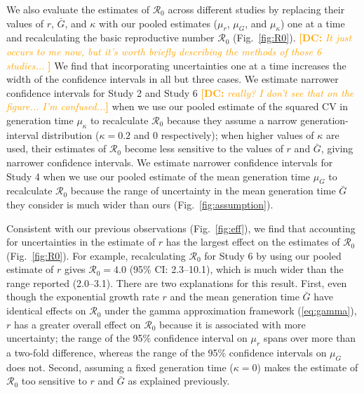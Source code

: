 \documentclass[12pt]{article}
\newcommand{\eref}[1]{(\ref{eq:#1})}
\newcommand{\fref}[1]{Fig.~\ref{fig:#1}}
\newcommand{\comment}[3]{\textcolor{#1}{\textbf{[#2: }\textsl{#3}\textbf{]}}}
\newcommand{\dc}[1]{\comment{Orange}{DC}{#1}}
\begin{document}
We also evaluate the estimates of $\mathcal R_0$ across different studies by 
replacing their values of $r$, $\bar G$, and $\kappa$ with our pooled estimates ($\mu_r$, $\mu_G$, and $\mu_\kappa$) one at a time and recalculating the basic reproductive number $\mathcal R_0$ (\fref{R0}).
\dc{It just occurs to me now, but it's worth briefly describing the methods of those 6 studies... }
We find that incorporating uncertainties one at a time increases the width of the confidence intervals in all but three cases.
We estimate narrower confidence intervals for Study 2 and Study 6 \dc{really? I don't see that on the figure... I'm confused...}
 when we use our pooled estimate of the squared CV in generation time $\mu_\kappa$ to recalculate $\mathcal R_0$ because they assume a narrow generation-interval distribution ($\kappa=0.2$ and $0$ respectively);
when higher values of $\kappa$ are used, their estimates of $\mathcal R_0$ become less sensitive to the values of $r$ and $\bar G$, giving narrower confidence intervals.
We estimate narrower confidence intervals for Study 4 when we use our pooled estimate of the mean generation time $\mu_G$ to recalculate $\mathcal R_0$ because the range of uncertainty in the mean generation time $\bar G$ they consider is much wider than ours (\fref{assumption}).

Consistent with our previous observations (\fref{eff}),
we find that accounting for uncertainties in the estimate of $r$ has the largest effect on the estimates of $\mathcal R_0$ (\fref{R0}).
For example, recalculating $\mathcal R_0$ for Study 6 by using our pooled estimate of $r$ gives $\mathcal R_0 = 4.0$ (95\% CI: 2.3--10.1), which is much wider than the range reported (2.0--3.1).
There are two explanations for this result.
First, even though the exponential growth rate $r$ and the mean generation time $\bar G$ have identical effects on $\mathcal R_0$ under the gamma approximation framework \eref{gamma},
$r$ has a greater overall effect on $\mathcal R_0$ because it is associated with more uncertainty;
the range of the 95\% confidence interval on $\mu_r$ spans over more than a two-fold difference, whereas the range of the 95\% confidence intervals on $\mu_G$ does not.
Second, assuming a fixed generation time ($\kappa=0$) makes the estimate of $\mathcal R_0$ too sensitive to $r$ and $\bar G$ as explained previously.
\end{document}
